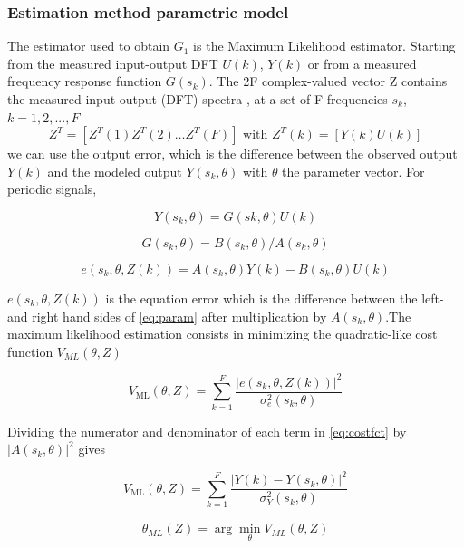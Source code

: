\documentclass[a4paper,12pt]{article}
\numberwithin{equation}{section}
\begin{document}
\subsubsection{Estimation method parametric model}
The estimator used to obtain $G_{1}$ is the Maximum Likelihood estimator. Starting from the measured input-output DFT $U(k)$, $Y(k)$ or from a measured frequency response function $G(s_{k})$. The 2F complex-valued vector Z contains the measured
input-output (DFT) spectra , at a set of F frequencies $s_{k}$, $k = 1, 2, ...,F$
 $$
Z^{T}=\left[Z^{T}(1) Z^{T}(2) \ldots Z^{T}(F)\right] \text { with } Z^{T}(k)=[Y(k) U(k)]
$$
\noindent
we can use the output error, which is the difference between the observed output $Y(k)$ and the modeled output $Y(s_{k},\theta)$ with $\theta$ the parameter vector. For periodic signals,

\begin{equation}\label{eq:param}
Y\left(s_{k}, \theta\right)=G\left(s{k}, \theta\right) U(k)
\end{equation}

$$
G(s_{k}, \theta)=B(s_{k}, \theta) / A(s_{k}, \theta)
$$

$$
e\left(s_{k}, \theta, Z(k)\right)=A\left(s_{k}, \theta\right) Y(k)-B\left(s_{k}, \theta\right) U(k)
$$

\noindent
$e\left(s_{k}, \theta, Z(k)\right)$ is the equation error  which is the difference between the left- and right hand sides of \ref{eq:param}  after multiplication by $A\left(s_{k}, \theta\right)$.The maximum likelihood estimation consists in minimizing the  quadratic-like cost function $V_{ML}(\theta
, Z)$

\begin{equation}\label{eq:costfct}
V_{\mathrm{ML}}(\theta, Z)=\sum_{k=1}^{F} \frac{\left|e\left(s_{k}, \theta, Z(k)\right)\right|^{2}}{\sigma_{e}^{2}\left(s_{k}, \theta\right)}
\end{equation}

Dividing the numerator and denominator of each term in \ref{eq:costfct} by $\left|A\left(s_{k}, \theta\right)\right|^{2}$ gives

\begin{equation}\label{eq:costfctML}
V_{\mathrm{ML}}(\theta, Z)=\sum_{k=1}^{F} \frac{\left|Y(k)-Y\left(s_{k}, \theta\right)\right|^{2}}{\sigma_{Y}^{2}\left(s_{k}, \theta\right)}
\end{equation}

\begin{equation}
\hat{\theta}_{ML}(Z)=\arg  \min _{\theta} V_{ML}(\theta, Z)
\end{equation}
\end{document}
